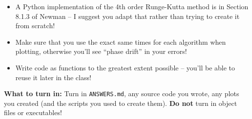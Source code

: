 \documentclass[10pt]{article}
\begin{document}
\begin{itemize}

  \item A Python implementation of the 4th order Runge-Kutta method is in
    Section 8.1.3 of Newman -- I suggest you adapt that rather than
    trying to create it from scratch!

  \item Make sure that you use the exact same times for each algorithm
    when plotting,
    otherwise you'll see ``phase drift'' in your errors!

   \item Write code as functions to the greatest extent possible --
     you'll be able to reuse it later in the class!
   
\end{itemize}


\vspace{5mm}

\noindent 
\textbf{What to turn in:} Turn in \texttt{ANSWERS.md}, any
source code you wrote, any plots you created (and the scripts you used
to create them).  \textbf{Do not} turn in object files or
executables!
\end{document}
